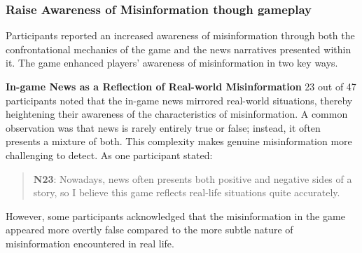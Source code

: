 \subsubsection{Raise Awareness of Misinformation though gameplay}
Participants reported an increased awareness of misinformation through both the confrontational mechanics of the game and the news narratives presented within it. The game enhanced players' awareness of misinformation in two key ways.

\textbf{In-game News as a Reflection of Real-world Misinformation} 23 out of 47 participants noted that the in-game news mirrored real-world situations, thereby heightening their awareness of the characteristics of misinformation. A common observation was that news is rarely entirely true or false; instead, it often presents a mixture of both. This complexity makes genuine misinformation more challenging to detect. As one participant stated:
\begin{quote}
\textbf{N23}:
Nowadays, news often presents both positive and negative sides of a story, so I believe this game reflects real-life situations quite accurately.
\end{quote}
However, some participants acknowledged that the misinformation in the game appeared more overtly false compared to the more subtle nature of misinformation encountered in real life.

